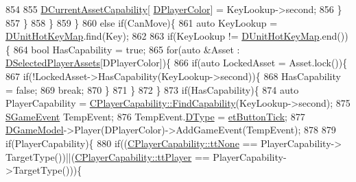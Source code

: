 \begin{DoxyCode}
854                             
855                             \hyperlink{classCApplicationData_a7e0dbfdc54f73dfa9838ae81b8017e2d}{DCurrentAssetCapability}[
      \hyperlink{classCApplicationData_a53550939b20cba70570f113e4d1c5d02}{DPlayerColor}] = KeyLookup->second;
856                         \}
857                     \}
858                 \}
859             \}
860             \textcolor{keywordflow}{else} \textcolor{keywordflow}{if}(CanMove)\{
861                 \textcolor{keyword}{auto} KeyLookup = \hyperlink{classCApplicationData_ae0c7b5849264d7234ffb160d54650f9a}{DUnitHotKeyMap}.find(Key);
862                 
863                 \textcolor{keywordflow}{if}(KeyLookup != \hyperlink{classCApplicationData_ae0c7b5849264d7234ffb160d54650f9a}{DUnitHotKeyMap}.end())\{
864                     \textcolor{keywordtype}{bool} HasCapability = \textcolor{keyword}{true};
865                     \textcolor{keywordflow}{for}(\textcolor{keyword}{auto} &Asset : \hyperlink{classCApplicationData_a05c1087d5a5c4ddc14fcb37444f1642b}{DSelectedPlayerAssets}[DPlayerColor])\{
866                         \textcolor{keywordflow}{if}(\textcolor{keyword}{auto} LockedAsset = Asset.lock())\{   
867                             \textcolor{keywordflow}{if}(!LockedAsset->HasCapability(KeyLookup->second))\{
868                                 HasCapability = \textcolor{keyword}{false};
869                                 \textcolor{keywordflow}{break};
870                             \}
871                         \}
872                     \}
873                     \textcolor{keywordflow}{if}(HasCapability)\{
874                         \textcolor{keyword}{auto} PlayerCapability = 
      \hyperlink{classCPlayerCapability_a881ba4b87385d7cfe5cb6ced2d26f226}{CPlayerCapability::FindCapability}(KeyLookup->second); 
875                         \hyperlink{structSGameEvent}{SGameEvent} TempEvent;
876                         TempEvent.\hyperlink{structSGameEvent_afa10562e243f4ac2b473b655cc58fee7}{DType} = \hyperlink{GameModel_8h_abfcf510bafec7c6429906a6ecaac656dafe7284f9af34794514e5dbfe974e3296}{etButtonTick};
877                         \hyperlink{classCApplicationData_a32b50c7c1cbac3cfd67c7f775b1d6fee}{DGameModel}->Player(DPlayerColor)->AddGameEvent(TempEvent);
878             
879                         \textcolor{keywordflow}{if}(PlayerCapability)\{
880                             \textcolor{keywordflow}{if}((\hyperlink{classCPlayerCapability_a9d3450ed1532fd536bd6cbb1e2eef02fac78f0e806a6b0ead030d63c27c9ce929}{CPlayerCapability::ttNone} == PlayerCapability->
      TargetType())||(\hyperlink{classCPlayerCapability_a9d3450ed1532fd536bd6cbb1e2eef02fafa6672fe0ac4e39cb5908cd5438b824f}{CPlayerCapability::ttPlayer} == PlayerCapability->TargetType()))\{

\end{DoxyCode}
